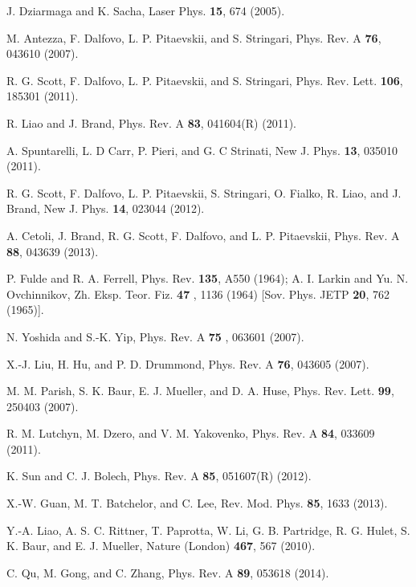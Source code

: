 \documentclass[prl,aps,twocolumn,showpacs, floatfix]{revtex4}
\begin{document}
\begin{thebibliography}{99}
 {J. Dziarmaga and K. Sacha, Laser Phys. \textbf{%
15}, 674 (2005).}

 {M. Antezza, F. Dalfovo, L. P. Pitaevskii, and S.
Stringari, Phys. Rev. A \textbf{76}, 043610 (2007).}

 {R. G. Scott, F. Dalfovo, L. P. Pitaevskii, and
S. Stringari, Phys. Rev. Lett. \textbf{106}, 185301 (2011).}

 {R. Liao and J. Brand, Phys. Rev. A \textbf{83},
041604(R) (2011). }

 {A. Spuntarelli, L. D Carr, P. Pieri, and G. C
Strinati, New J. Phys. \textbf{13}, 035010 (2011). }

 {R. G. Scott, F. Dalfovo, L. P. Pitaevskii, S.
Stringari, O. Fialko, R. Liao, and J. Brand, New J. Phys. \textbf{14},
023044 (2012). }

 {A. Cetoli, J. Brand, R. G. Scott, F. Dalfovo, and
L. P. Pitaevskii, Phys. Rev. A \textbf{88}, 043639 (2013).}

 {P. Fulde and R. A. Ferrell, Phys. Rev. \textbf{135}, A550
(1964); A. I. Larkin and Yu. N. Ovchinnikov, Zh. Eksp. Teor. Fiz. \textbf{47}%
, 1136 (1964) [Sov. Phys. JETP \textbf{20}, 762 (1965)].}

 {N. Yoshida and S.-K. Yip, Phys. Rev. A \textbf{75}%
, 063601 (2007).}

 {X.-J. Liu, H. Hu, and P. D. Drummond, Phys. Rev. A
\textbf{76}, 043605 (2007).}

 {M. M. Parish, S. K. Baur, E. J. Mueller, and D. A.
Huse, Phys. Rev. Lett. \textbf{99}, 250403 (2007).}

 {R. M. Lutchyn, M. Dzero, and V. M. Yakovenko, Phys.
Rev. A \textbf{84}, 033609 (2011).}

 {K. Sun and C. J. Bolech, Phys. Rev. A \textbf{85},
051607(R) (2012).}

 {X.-W. Guan, M. T. Batchelor, and C. Lee, Rev. Mod.
Phys. \textbf{85}, 1633 (2013).}

 {Y.-A. Liao, A. S. C. Rittner, T. Paprotta, W. Li,
G. B. Partridge, R. G. Hulet, S. K. Baur, and E. J. Mueller, Nature (London)
\textbf{467}, 567 (2010).}

 {C. Qu, M. Gong, and C. Zhang, Phys. Rev. A \textbf{89},
053618 (2014). }


\end{thebibliography}
\end{document}
